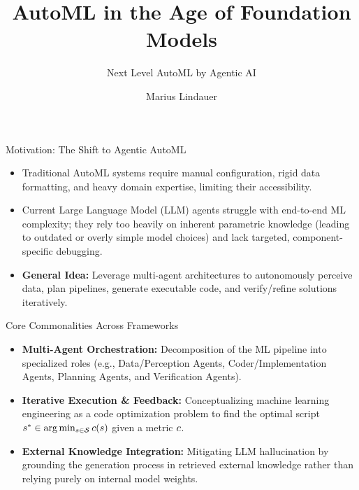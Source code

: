 \documentclass[main]{subfiles}
\title[AutoML in the Age of Foundation Models]{AutoML in the Age of Foundation Models}
\subtitle{Next Level AutoML by Agentic AI}
\author[Marius Lindauer]{Marius Lindauer}
\date{}
\begin{document}
	
	\maketitle
	

\begin{frame}{Motivation: The Shift to Agentic AutoML}
\begin{itemize}
    \item Traditional AutoML systems require manual configuration, rigid data formatting, and heavy domain expertise, limiting their accessibility.
    \item Current Large Language Model (LLM) agents struggle with end-to-end ML complexity; they rely too heavily on inherent parametric knowledge (leading to outdated or overly simple model choices) and lack targeted, component-specific debugging.
    \item \textbf{General Idea:} Leverage multi-agent architectures to autonomously perceive data, plan pipelines, generate executable code, and verify/refine solutions iteratively. \end{itemize}
\end{frame}

\begin{frame}{Core Commonalities Across Frameworks}
\begin{itemize}
    \item \textbf{Multi-Agent Orchestration:} Decomposition of the ML pipeline into specialized roles (e.g., Data/Perception Agents, Coder/Implementation Agents, Planning Agents, and Verification Agents).     \item \textbf{Iterative Execution \& Feedback:} Conceptualizing machine learning engineering as a code optimization problem to find the optimal script $s^* \in \arg\min_{s \in \mathcal{S}} c(s)$ given a metric $c$.
    \item \textbf{External Knowledge Integration:} Mitigating LLM hallucination by grounding the generation process in retrieved external knowledge rather than relying purely on internal model weights.
\end{itemize}
\end{frame}
\end{document}

